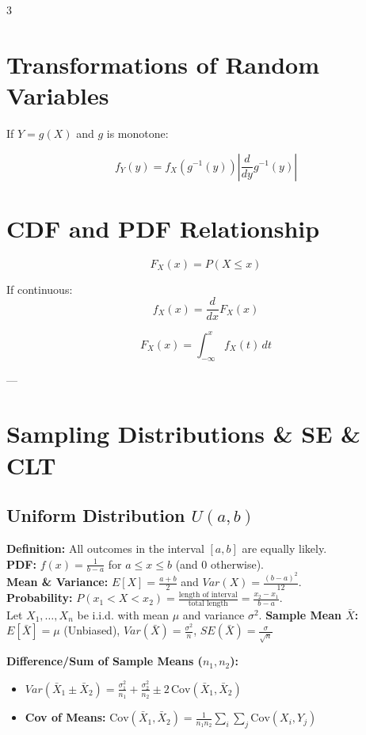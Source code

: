 \documentclass[10pt]{article}
\begin{document}
\begin{multicols}{3}
\section*{Transformations of Random Variables}

If $Y=g(X)$ and $g$ is monotone:

\[
f_Y(y)=f_X(g^{-1}(y))\left|\frac{d}{dy}g^{-1}(y)\right|
\]


\section*{CDF and PDF Relationship}

\[
F_X(x)=P(X\le x)
\]

If continuous:
\[
f_X(x)=\frac{d}{dx}F_X(x)
\]

\[
F_X(x)=\int_{-\infty}^{x} f_X(t)\,dt
\]

---

\section*{Sampling Distributions \& SE \& CLT}

\subsection*{Uniform Distribution $U(a, b)$}

\textbf{Definition:} All outcomes in the interval $[a, b]$ are equally likely. \\
\textbf{PDF:} $f(x) = \frac{1}{b-a}$ for $a \le x \le b$ (and $0$ otherwise). \\
\textbf{Mean \& Variance:} $E[X] = \frac{a+b}{2}$ and $Var(X) = \frac{(b-a)^2}{12}$. \\
\textbf{Probability:} $P(x_1 < X < x_2) = \frac{\text{length of interval}}{\text{total length}} = \frac{x_2 - x_1}{b - a}$. \\

Let $X_1,\dots,X_n$ be i.i.d. with mean $\mu$ and variance $\sigma^2$.
\textbf{Sample Mean $\bar X$:} $E[\bar X]=\mu$ (Unbiased), $Var(\bar X)=\frac{\sigma^2}{n}$, $SE(\bar X)=\frac{\sigma}{\sqrt n}$

\textbf{Difference/Sum of Sample Means ($n_1, n_2$):}
\begin{itemize}
    \item $Var(\bar{X}_1 \pm \bar{X}_2) = \frac{\sigma_1^2}{n_1} + \frac{\sigma_2^2}{n_2} \pm 2\,\text{Cov}(\bar{X}_1, \bar{X}_2)$
    \item \textbf{Cov of Means:} $\text{Cov}(\bar{X}_1, \bar{X}_2) = \frac{1}{n_1 n_2} \sum_{i} \sum_{j} \text{Cov}(X_i, Y_j)$
\end{itemize}


\end{multicols}
\end{document}
